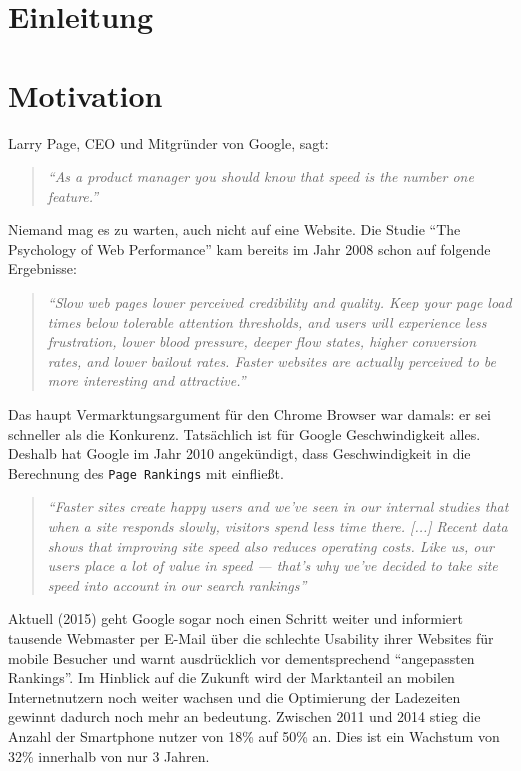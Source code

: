 \section{Einleitung} %
\label{sec:einleitung}




\section{Motivation} %
\label{sub:motivation}

	Larry Page, CEO und Mitgründer von Google, sagt:
	\begin{quote}
		\textit{"`As a product manager you should know that speed is the number one feature."'}\autocite{holzle10}
	\end{quote}
	Niemand mag es zu warten, auch nicht auf eine Website. Die Studie "`The Psychology of Web Performance"' kam bereits im Jahr 2008 schon auf folgende Ergebnisse:

	\begin{quote}\itshape
		"`Slow web pages lower perceived credibility and quality. Keep your page load times below tolerable attention thresholds, and users will experience less frustration, lower blood pressure, deeper flow states, higher conversion rates, and lower bailout rates. Faster websites are actually perceived to be more interesting and attractive."' \autocite{webOpti08}
	\end{quote}

	Das haupt Vermarktungsargument für den Chrome Browser war damals: er sei schneller als die Konkurenz.	Tatsächlich ist für Google Geschwindigkeit alles. Deshalb hat Google im Jahr 2010 angekündigt, dass Geschwindigkeit in die Berechnung des \texttt{Page Rankings} mit einfließt.

	\begin{quote}\itshape
		"`Faster sites create happy users and we've seen in our internal studies that when a site responds slowly, visitors spend less time there. [...] Recent data shows that improving site speed also reduces operating costs. Like us, our users place a lot of value in speed — that's why we've decided to take site speed into account in our search rankings"'\autocite{google10}
	\end{quote}

	Aktuell (2015) geht Google sogar noch einen Schritt weiter und informiert tausende Webmaster per E-Mail über die schlechte Usability ihrer Websites für mobile Besucher und warnt ausdrücklich vor dementsprechend "`angepassten Rankings"'.\autocite{t3n15}
	Im Hinblick auf die Zukunft wird der Marktanteil an mobilen Internetnutzern noch weiter wachsen und die Optimierung der Ladezeiten gewinnt dadurch noch mehr an bedeutung. Zwischen 2011 und 2014 stieg die Anzahl der Smartphone nutzer von 18\% auf 50\% an. Dies ist ein Wachstum von 32\% innerhalb von nur 3 Jahren.\autocite{tns14}\\

